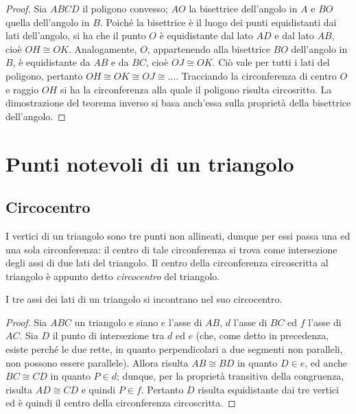 \begin{proof}
Sia $ABCD$ il poligono convesso; $AO$ la bisettrice dell'angolo in $A$ e $BO$ quella dell'angolo in $B$. Poiché la bisettrice è il luogo dei punti equidistanti dai lati dell'angolo, si ha che il punto $O$ è equidistante dal lato $AD$ e dal lato $AB$, cioè $OH\cong OK$. Analogamente, $O$, appartenendo alla bisettrice $BO$ dell'angolo in $B$, è equidistante da $AB$ e da $BC$, cioè $OJ\cong OK$. Ciò vale per tutti i lati del poligono, pertanto $OH\cong OK\cong OJ\cong \ldots$. Tracciando la circonferenza di centro $O$ e raggio $OH$ si ha la circonferenza alla quale il poligono risulta circosritto.
La dimostrazione del teorema inverso si basa anch’essa sulla proprietà della bisettrice dell’angolo.
\end{proof}


\section{Punti notevoli di un triangolo}

\subsection{Circocentro}

I vertici di un triangolo sono tre punti non allineati, dunque per essi passa una ed una sola circonferenza: il centro di tale circonferenza si trova come intersezione degli assi di due lati del triangolo. Il centro della circonferenza circoscritta al triangolo è appunto detto \emph{circocentro} del triangolo.
\begin{teorema}
I tre assi dei lati di un triangolo si incontrano nel suo circocentro.
\end{teorema}

\begin{proof}
Sia $ABC$ un triangolo e siano $e$ l'asse di $AB$, $d$ l'asse di $BC$ ed $f$ l'asse di $AC$. Sia $D$ il punto di intersezione tra $d$ ed $e$ (che, come detto in precedenza, esiste perché le due rette, in quanto perpendicolari a due segmenti non paralleli, non possono essere parallele). Allora risulta $AB\cong BD$ in quanto $D\in e$, ed anche $BC\cong CD$ in quanto $P\in d$; dunque, per la proprietà transitiva della congruenza, risulta $AD\cong CD$ e quindi $P\in f$. Pertanto $D$ risulta equidistante dai tre vertici ed è quindi il centro della circonferenza circoscritta.
\end{proof}

